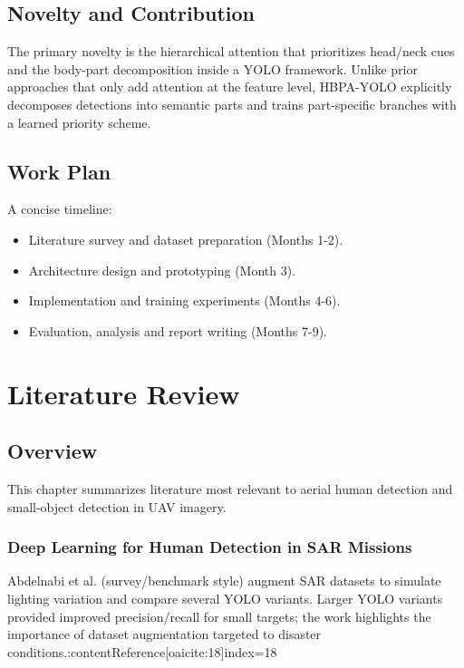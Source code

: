 \documentclass[12pt,a4paper]{report}
\begin{document}
\section{Novelty and Contribution}
The primary novelty is the hierarchical attention that prioritizes head/neck cues and the body-part decomposition inside a YOLO framework. Unlike prior approaches that only add attention at the feature level, HBPA-YOLO explicitly decomposes detections into semantic parts and trains part-specific branches with a learned priority scheme.

\section{Work Plan}
A concise timeline:
\begin{itemize}
  \item Literature survey and dataset preparation (Months 1-2).
  \item Architecture design and prototyping (Month 3).
  \item Implementation and training experiments (Months 4-6).
  \item Evaluation, analysis and report writing (Months 7-9).
\end{itemize}



\chapter{Literature Review}

\section{Overview}
This chapter summarizes literature most relevant to aerial human detection and small-object detection in UAV imagery.

\subsection{Deep Learning for Human Detection in SAR Missions}
Abdelnabi et al. (survey/benchmark style) augment SAR datasets to simulate lighting variation and compare several YOLO variants. Larger YOLO variants provided improved precision/recall for small targets; the work highlights the importance of dataset augmentation targeted to disaster conditions.:contentReference[oaicite:18]{index=18}
\end{document}
